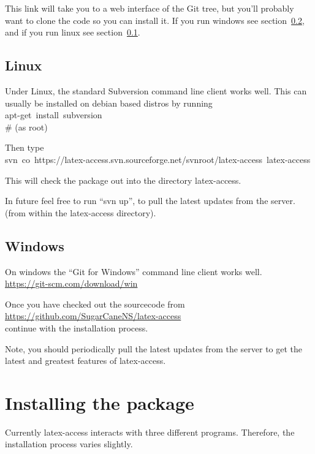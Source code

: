 \documentclass[12pt,a4paper]{report}
\begin{document}
This link will take you to a web interface of the Git tree, but you'll
probably want to clone the code so you can install it. If you run
windows see section~\ref{subsubchap-windows}, and if you run linux
see section~\ref{subsubchap-linux}.

\subsection{Linux}
\label{subsubchap-linux}

Under Linux, the standard Subversion command line client works
well. This can usually be installed on debian based distros by running\\
\mbox{apt-get install subversion}\\
\# (as root)

Then type\\
\mbox{svn co https://latex-access.svn.sourceforge.net/svnroot/latex-access latex-access}

This will check the package out into the directory latex-access.

In future feel free to run ``svn up'', to pull the latest updates from
the server. (from within the latex-access directory).

\subsection{Windows}
\label{subsubchap-windows}

On windows the ``Git for Windows'' command line client works well.\\
\url{https://git-scm.com/download/win}

Once you have checked out the sourcecode from\\
\url{https://github.com/SugarCaneNS/latex-access}\\
continue with the installation
process.

Note, you should periodically pull the latest updates from the server to
get the latest and greatest features of latex-access.

\section{Installing the package}

Currently latex-access interacts with three different
programs. Therefore, the installation process varies slightly.
\end{document}
